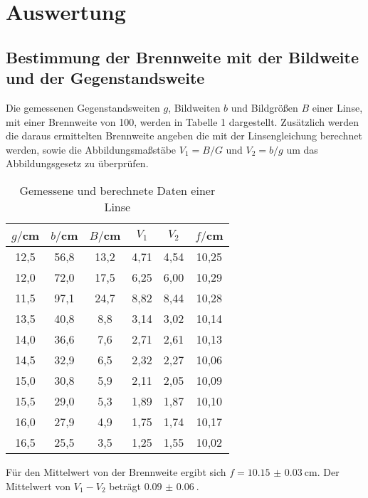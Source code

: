 \section{Auswertung}
\label{sec:Auswertung}

\subsection{Bestimmung der Brennweite mit der Bildweite und der Gegenstandsweite}

Die gemessenen Gegenstandsweiten $g$, Bildweiten $b$ und Bildgrößen $B$ einer Linse, mit einer
Brennweite von 100, werden in Tabelle 1 dargestellt. Zusätzlich werden die daraus ermittelten
Brennweite angeben die mit der Linsengleichung berechnet werden, sowie die Abbildungsmaßstäbe $V_1 = B/G$ und $V_2=b/g$
um das Abbildungsgesetz zu überprüfen.
\begin{table}[H]
  \centering
  \caption{Gemessene und berechnete Daten einer Linse}
  \label{tab:Widerstand}
  \begin{tabular}{c c c c c c}
    \toprule
    $g/$cm  & $b/$cm & $B / $cm & $V_1$ & $V_2$ & $f/$cm \\
    \midrule
    12,5 &    56,8  & 13,2 & 4,71 &   4,54   &  10,25   \\
    12,0 &    72,0  & 17,5 & 6,25 &   6,00   &  10,29   \\
    11,5 &    97,1  & 24,7 & 8,82 &   8,44   &  10,28   \\
    13,5 &    40,8  & 8,8  & 3,14 &   3,02   &  10,14  \\
    14,0 &    36,6  & 7,6  & 2,71 &   2,61   &  10,13  \\
    14,5 &    32,9  & 6,5  & 2,32 &   2,27   &  10,06  \\
    15,0 &    30,8  & 5,9  & 2,11 &   2,05   &  10,09  \\
    15,5 &    29,0  & 5,3  & 1,89 &   1,87   &  10,10  \\
    16,0 &    27,9  & 4,9  & 1,75 &   1,74   &  10,17  \\
    16,5 &    25,5  & 3,5  & 1,25 &   1,55   &  10,02  \\
    \bottomrule
  \end{tabular}
\end{table}



Für den Mittelwert von der Brennweite ergibt sich $f = \SI{10.15(3)}{\centi\meter}$. Der
Mittelwert von $V_1 - V_2$ beträgt $\SI{0.09(6)}{}$.

